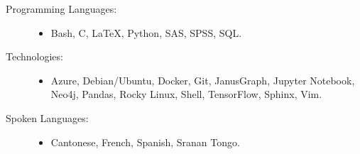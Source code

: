 \documentclass[letterpaper,10pt,english]{sphinxmanual}
\begin{document}
\begin{description}
\item[{Programming Languages:}] \leavevmode\begin{itemize}
\item {} 
\sphinxAtStartPar
Bash, C, LaTeX, Python, SAS, SPSS, SQL.

\end{itemize}

\item[{Technologies:}] \leavevmode\begin{itemize}
\item {} 
\sphinxAtStartPar
Azure, Debian/Ubuntu, Docker, Git, JanusGraph, Jupyter Notebook, Neo4j, Pandas, Rocky Linux, Shell, TensorFlow, Sphinx, Vim.

\end{itemize}

\item[{Spoken Languages:}] \leavevmode\begin{itemize}
\item {} 
\sphinxAtStartPar
Cantonese, French, Spanish, Sranan Tongo.

\end{itemize}

\end{description}







\renewcommand{\indexname}{Index}
\printindex
\end{document}
